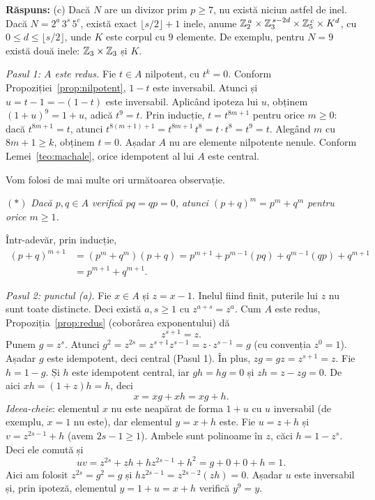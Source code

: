 \noindent\textbf{Răspuns:} (c) Dacă $N$ are un divizor prim $p\ge 7$, nu există niciun astfel de inel. Dacă $N=2^{a}\,3^{s}\,5^{c}$, există exact $\lfloor s/2\rfloor+1$ inele, anume $\mathbb{Z}_2^{\,a}\times\mathbb{Z}_3^{\,s-2d}\times\mathbb{Z}_5^{\,c}\times K^{d}$, cu $0\le d\le\lfloor s/2\rfloor$, unde $K$ este corpul cu $9$ elemente. De exemplu, pentru $N=9$ există două inele: $\mathbb{Z}_3\times\mathbb{Z}_3$ și $K$.

\begin{solutie}
\textit{Pasul 1: $A$ este redus.} Fie $t\in A$ nilpotent, cu $t^{k}=0$. Conform Propoziției~\ref{prop:nilpotent}, $1-t$ este inversabil. Atunci și $u=t-1=-(1-t)$ este inversabil. Aplicând ipoteza lui $u$, obținem $(1+u)^{9}=1+u$, adică $t^{9}=t$. Prin inducție, $t=t^{8m+1}$ pentru orice $m\ge 0$: dacă $t^{8m+1}=t$, atunci $t^{8(m+1)+1}=t^{8m+1}\,t^{8}=t\cdot t^{8}=t^{9}=t$. Alegând $m$ cu $8m+1\ge k$, obținem $t=0$. Așadar $A$ nu are elemente nilpotente nenule. Conform Lemei~\ref{teo:machale}, orice idempotent al lui $A$ este central.

Vom folosi de mai multe ori următoarea observație.

$(\ast)$ \emph{Dacă $p,q\in A$ verifică $pq=qp=0$, atunci $(p+q)^{m}=p^{m}+q^{m}$ pentru orice $m\ge 1$.}

Într-adevăr, prin inducție,
\[
  \begin{aligned}
  (p+q)^{m+1}&=(p^{m}+q^{m})(p+q)=p^{m+1}+p^{m-1}(pq)+q^{m-1}(qp)+q^{m+1}\\
  &=p^{m+1}+q^{m+1}.
  \end{aligned}
\]

\smallskip
\textit{Pasul 2: punctul (a).} Fie $x\in A$ și $z=x-1$. Inelul fiind finit, puterile lui $z$ nu sunt toate distincte. Deci există $a,s\ge 1$ cu $z^{a+s}=z^{a}$. Cum $A$ este redus, Propoziția~\ref{prop:redus} (coborârea exponentului) dă
\[
  z^{s+1}=z .
\]
Punem $g=z^{s}$. Atunci $g^{2}=z^{2s}=z^{s+1}z^{s-1}=z\cdot z^{s-1}=g$ (cu convenția $z^{0}=1$). Așadar $g$ este idempotent, deci central (Pasul 1). În plus, $zg=gz=z^{s+1}=z$. Fie $h=1-g$. Și $h$ este idempotent central, iar $gh=hg=0$ și $zh=z-zg=0$. De aici $xh=(1+z)h=h$, deci
\[
  x=xg+xh=xg+h. \tag{1}
\]
\emph{Ideea-cheie}: elementul $x$ nu este neapărat de forma $1+u$ cu $u$ inversabil (de exemplu, $x=1$ nu este), dar elementul $y=x+h$ este. Fie $u=z+h$ și $v=z^{2s-1}+h$ (avem $2s-1\ge 1$). Ambele sunt polinoame în $z$, căci $h=1-z^{s}$. Deci ele comută și
\[
  uv=z^{2s}+zh+hz^{2s-1}+h^{2}=g+0+0+h=1 .
\]
Aici am folosit $z^{2s}=g^{2}=g$ și $hz^{2s-1}=z^{2s-2}(zh)=0$. Așadar $u$ este inversabil și, prin ipoteză, elementul $y=1+u=x+h$ verifică $y^{9}=y$.


\end{solutie}
